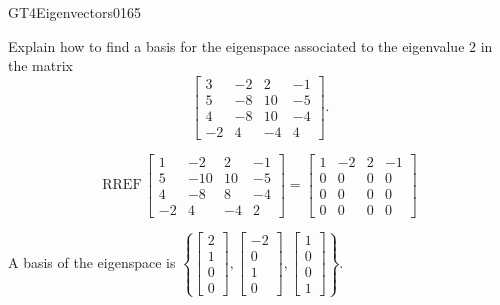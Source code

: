 \begin{exercise}{GT4}{Eigenvectors}{0165} 
\begin{exerciseStatement} 

Explain how to find a basis for the eigenspace associated to the eigenvalue \(2\) in the matrix \[\left[\begin{array}{cccc}
3 & -2 & 2 & -1 \\
5 & -8 & 10 & -5 \\
4 & -8 & 10 & -4 \\
-2 & 4 & -4 & 4
\end{array}\right].\]

 \end{exerciseStatement}
 \begin{exerciseAnswer} 

\[\mathrm{RREF}\,\left[\begin{array}{cccc}
1 & -2 & 2 & -1 \\
5 & -10 & 10 & -5 \\
4 & -8 & 8 & -4 \\
-2 & 4 & -4 & 2
\end{array}\right]=\left[\begin{array}{cccc}
1 & -2 & 2 & -1 \\
0 & 0 & 0 & 0 \\
0 & 0 & 0 & 0 \\
0 & 0 & 0 & 0
\end{array}\right]\]

 

A basis of the eigenspace is \(\left\{ \left[\begin{array}{c}
2 \\
1 \\
0 \\
0
\end{array}\right] , \left[\begin{array}{c}
-2 \\
0 \\
1 \\
0
\end{array}\right] , \left[\begin{array}{c}
1 \\
0 \\
0 \\
1
\end{array}\right] \right\}\).

 \end{exerciseAnswer}
 \end{exercise}



